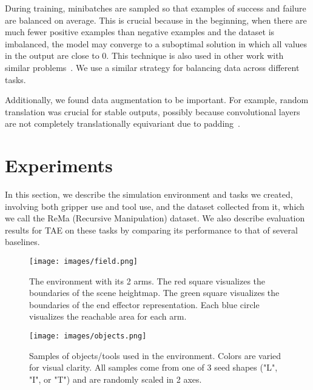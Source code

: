 \documentclass[10pt,twocolumn,letterpaper]{article}
\begin{document}
During training, minibatches are sampled so that examples of success and failure are balanced on average. This is crucial because in the beginning, when there are much fewer positive examples than negative examples and the dataset is imbalanced, the model may converge to a suboptimal solution in which all values in the output are close to 0. This technique is also used in other work with similar problems~\cite{xu2020adagrasp, Mo_2021_ICCV}. We use a similar strategy for balancing data across different tasks.


Additionally, we found data augmentation to be important. For example, random translation was crucial for stable outputs, possibly because convolutional layers are not completely translationally equivariant due to padding~\cite{islam2020much}.

\section{Experiments}

In this section, we describe the simulation environment and tasks we created, involving both gripper use and tool use, and the dataset collected from it, which we call the ReMa (Recursive Manipulation) dataset. We also describe evaluation results for TAE on these tasks by comparing its performance to that of several baselines.

\begin{figure}
    \texttt{[image: images/field.png]}
    \caption{The environment with its 2 arms. The red square visualizes the boundaries of the scene heightmap. The green square visualizes the boundaries of the end effector representation. Each blue circle visualizes the reachable area for each arm.}
    \label{fig:field}
\end{figure}
  
\begin{figure}
    \texttt{[image: images/objects.png]}
    \caption{Samples of objects/tools used in the environment. Colors are varied for visual clarity. All samples come from one of 3 seed shapes ("L", "I", or "T") and are randomly scaled in 2 axes.}
    \label{fig:objects}
\end{figure}
\end{document}
